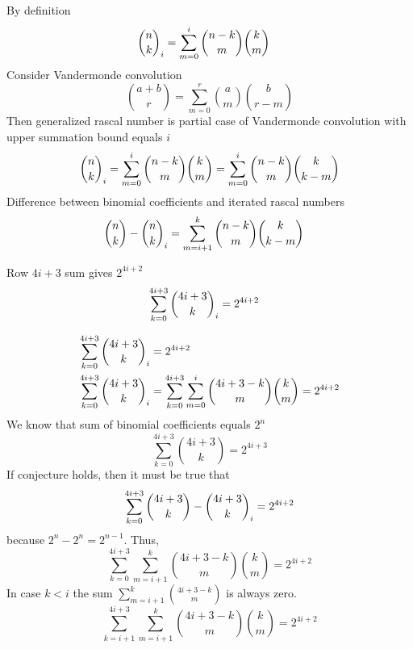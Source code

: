 ﻿By definition
\begin{align}
    \binom{n}{k}_{i} &= \sum_{m=0}^{i} \binom{n-k}{m} \binom{k}{m}
\end{align}
Consider Vandermonde convolution
\begin{equation*}
    \binom{a+b}{r} = \sum_{m=0}^{r} \binom{a}{m} \binom{b}{r-m}
\end{equation*}
Then generalized rascal number is partial case of Vandermonde convolution with upper summation bound equals $i$
\begin{equation*}
    \binom{n}{k}_{i} = \sum_{m=0}^{i} \binom{n-k}{m} \binom{k}{m} = \sum_{m=0}^{i} \binom{n-k}{m} \binom{k}{k-m}
\end{equation*}
Difference between binomial coefficients and iterated rascal numbers
\begin{align*}
    \binom{n}{k} - \binom{n}{k}_{i} &= \sum_{m=i+1}^{k} \binom{n-k}{m} \binom{k}{k-m}
\end{align*}
\begin{proposition}
    Row $4i+3$ sum gives $2^{4i+2}$
    \begin{align*}
        \sum_{k=0}^{4i+3} \binom{4i+3}{k}_{i} &= 2^{4i+2}
    \end{align*}
\end{proposition}
\begin{align*}
    \sum_{k=0}^{4i+3} \binom{4i+3}{k}_{i} &= 2^{4i+2} \\
    \sum_{k=0}^{4i+3} \binom{4i+3}{k}_{i} &= \sum_{k=0}^{4i+3} \sum_{m=0}^{i} \binom{4i+3-k}{m} \binom{k}{m} = 2^{4i+2}
\end{align*}
We know that sum of binomial coefficients equals $2^n$
\begin{equation*}
    \sum_{k=0}^{4i+3} \binom{4i+3}{k}  = 2^{4i+3}
\end{equation*}
If conjecture holds, then it must be true that
\begin{equation*}
    \sum_{k=0}^{4i+3} \binom{4i+3}{k} - \binom{4i+3}{k}_{i} = 2^{4i+2}
\end{equation*}
because $2^n - 2^n = 2^{n-1}$.
Thus,
\begin{equation*}
    \sum_{k=0}^{4i+3} \sum_{m=i+1}^{k} \binom{4i+3-k}{m} \binom{k}{m} = 2^{4i+2}
\end{equation*}
In case $k<i$ the sum $\sum_{m=i+1}^{k} \binom{4i+3-k}{m}$ is always zero.
\begin{equation*}
    \sum_{k=i+1}^{4i+3} \sum_{m=i+1}^{k} \binom{4i+3-k}{m} \binom{k}{m} = 2^{4i+2}
\end{equation*}
